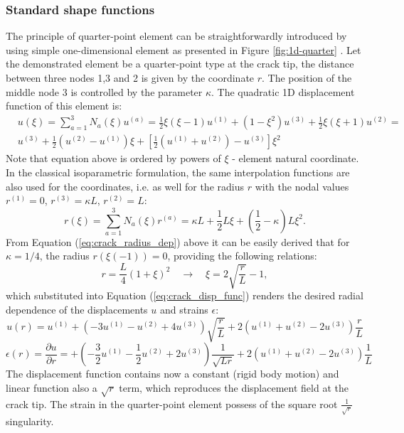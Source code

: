 \documentclass[11pt]{ACMEarticle}
\numberwithin{equation}{section}
\begin{document}
\subsubsection{Standard shape functions} 
The principle of quarter-point element can be straightforwardly introduced by using simple one-dimensional element as presented in Figure \ref{fig:1d-quarter} \citep{kuna2013finite}.
Let the demonstrated element be a quarter-point type at the crack tip, the distance between three nodes 1,3 and 2 is given by the coordinate $r$. The position of the middle node 3 is controlled by the parameter $\kappa$. The quadratic 1D displacement function of this element is: 
\begin{equation}\label{eq:crack_disp_func}
\begin{aligned}
&u(\xi) = \sum_{a=1}^3 N_a (\xi) u^{(a)} = \frac{1}{2} \xi (\xi - 1)u^{(1)} + (1 - \xi^2)u^{(3)} + \frac{1}{2} \xi (\xi + 1)u^{(2)} =\\
& u^{(3)} + \frac{1}{2}(u^{(2)} - u^{(1)})\xi + \left[ \frac{1}{2} (u^{(1)} + u^{(2)}) - u^{(3)} \right] \xi^2 
\end{aligned}
\end{equation}
Note that equation above is ordered by powers of $\xi$ - element natural coordinate. In the classical isoparametric formulation, the same interpolation functions are also used for the coordinates, i.e. as well for the radius $r$ with the nodal values $r^{(1)} = 0$, $r^{(3)} = \kappa L$, $r^{(2)} = L$:
\begin{equation}\label{eq:crack_radius_dep}
r(\xi) = \sum_{a=1}^3 N_a (\xi) r^{(a)} = \kappa L + \frac{1}{2} L \xi  + \left(  \frac{1}{2} - \kappa \right) L \xi^2.
\end{equation}
From Equation (\ref{eq:crack_radius_dep}) above it can be easily derived that for $ \kappa=1/4$, the radius $r(\xi(-1)) = 0$, providing the following relations:
\begin{equation}
r= \frac{L}{4}(1+\xi)^2 \quad \rightarrow \quad \xi = 2 \sqrt{\frac{r}{L}} -1,
\end{equation}
which substituted into Equation (\ref{eq:crack_disp_func}) renders the desired radial dependence of the displacements $u$ and strains $\epsilon$:
\begin{equation*}
u(r) = u^{(1)} + \left( -3u^{(1)} - u^{(2)} +4u^{(3)} \right) \sqrt{\frac{r}{L}} + 2 \left( u^{(1)} + u^{(2)} -2 u^{(3)} \right) \frac{r}{L}
\end{equation*}
\begin{equation}
\epsilon(r) = \frac{\partial u}{ \partial r} = + \left( - \frac{3}{2}u^{(1)} - \frac{1}{2}u^{(2)} +2u^{(3)} \right) \frac{1}{\sqrt{Lr}} + 2 \left( u^{(1)} + u^{(2)} -2 u^{(3)} \right) \frac{1}{L}
\end{equation}
The displacement function contains now a constant (rigid body motion) and linear function also a $\sqrt r$ term, which reproduces the displacement field at the crack tip. The strain in the quarter-point element possess of the square root $\frac{1}{\sqrt r}$ singularity.
\end{document}
